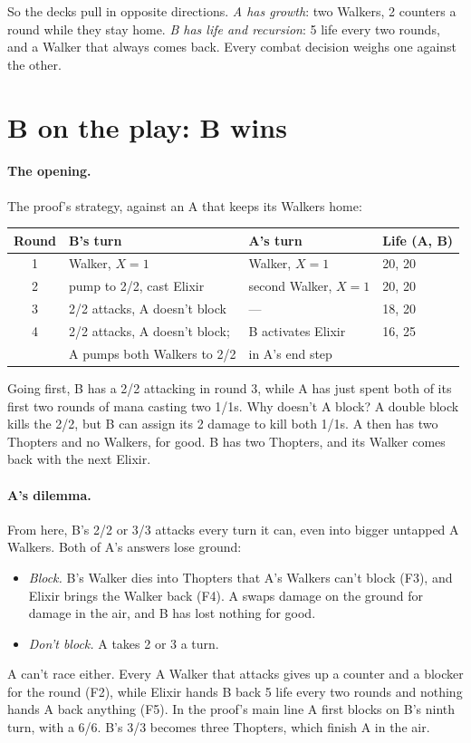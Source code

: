 \documentclass[11pt]{article}
\begin{document}
\noindent
So the decks pull in opposite directions. \emph{A has growth}: two
Walkers, 2 counters a round while they stay home. \emph{B has life and
recursion}: 5 life every two rounds, and a Walker that always comes back.
Every combat decision weighs one against the other.

\section{B on the play: B wins}

\paragraph{The opening.} The proof's strategy, against an A that keeps
its Walkers home:

\begin{center}
\begin{tabular}{clll}
\toprule
Round & B's turn & A's turn & Life (A, B) \\
\midrule
1 & Walker, $X=1$ & Walker, $X=1$ & 20, 20 \\
2 & pump to 2/2, cast Elixir & second Walker, $X=1$ & 20, 20 \\
3 & 2/2 attacks, A doesn't block & --- & 18, 20 \\
4 & 2/2 attacks, A doesn't block; & B activates Elixir & 16, 25 \\
  & \quad A pumps both Walkers to 2/2 & \quad in A's end step & \\
\bottomrule
\end{tabular}
\end{center}

\noindent
Going first, B has a 2/2 attacking in round 3, while A has just spent
both of its first two rounds of mana casting two 1/1s. Why doesn't A
block? A double block kills the 2/2, but B can assign its 2 damage to kill
both 1/1s. A then has two Thopters and no Walkers, for good. B has two
Thopters, and its Walker comes back with the next Elixir.

\paragraph{A's dilemma.} From here, B's 2/2 or 3/3 attacks every turn
it can, even into bigger untapped A Walkers. Both of A's answers lose
ground:
\begin{itemize}
\item \emph{Block.} B's Walker dies into Thopters that A's Walkers can't
  block (F3), and Elixir brings the Walker back (F4). A swaps damage on
  the ground for damage in the air, and B has lost nothing for good.
\item \emph{Don't block.} A takes 2 or 3 a turn.
\end{itemize}
A can't race either. Every A Walker that attacks gives up a counter and
a blocker for the round (F2), while Elixir hands B back 5 life every two
rounds and nothing hands A back anything (F5). In the proof's main line
A first blocks on B's ninth turn, with a 6/6. B's 3/3 becomes three
Thopters, which finish A in the air.
\end{document}
